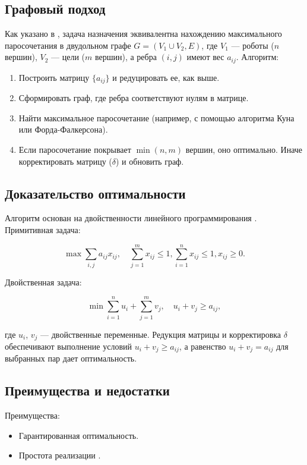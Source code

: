 \subsection{Графовый подход}
Как указано в \cite{emaxx2025}, задача назначения эквивалентна нахождению максимального паросочетания в двудольном графе \( G = (V_1 \cup V_2, E) \), где \( V_1 \) --- роботы (\( n \) вершин), \( V_2 \) --- цели (\( m \) вершин), а ребра \( (i,j) \) имеют вес \( a_{ij} \). Алгоритм:

\begin{enumerate}
    \item Построить матрицу \( \{a_{ij}\} \) и редуцировать ее, как выше.
    \item Сформировать граф, где ребра соответствуют нулям в матрице.
    \item Найти максимальное паросочетание (например, с помощью алгоритма Куна или Форда-Фалкерсона).
    \item Если паросочетание покрывает \( \min(n, m) \) вершин, оно оптимально. Иначе корректировать матрицу (\( \delta \)) и обновить граф.
\end{enumerate}

\subsection{Доказательство оптимальности}
Алгоритм основан на двойственности линейного программирования \cite{kuhn1955}. Примитивная задача:

\[
\max \sum_{i,j} a_{ij} x_{ij}, \quad \sum_{j=1}^m x_{ij} \leq 1, \sum_{i=1}^n x_{ij} \leq 1, x_{ij} \geq 0.
\]

Двойственная задача:

\[
\min \sum_{i=1}^n u_i + \sum_{j=1}^m v_j, \quad u_i + v_j \geq a_{ij},
\]

\noindent где \( u_i \), \( v_j \) --- двойственные переменные. Редукция матрицы и корректировка \( \delta \) обеспечивают выполнение условий \( u_i + v_j \geq a_{ij} \), а равенство \( u_i + v_j = a_{ij} \) для выбранных пар дает оптимальность.

\subsection{Преимущества и недостатки}
Преимущества:
\begin{itemize}
    \item Гарантированная оптимальность.
    \item Простота реализации \cite{emaxx2025}.
\end{itemize}

